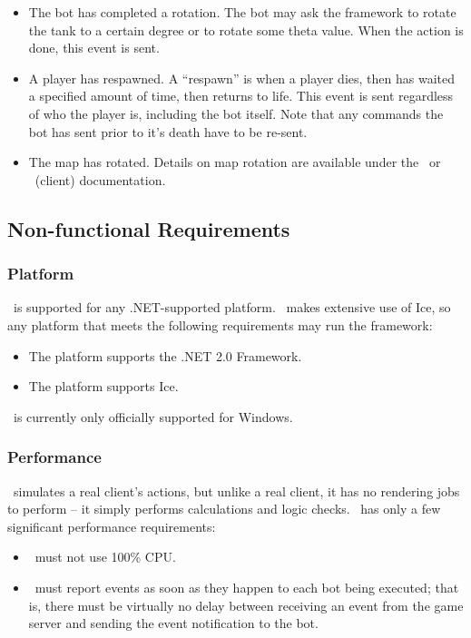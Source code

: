 \begin{itemize}
\item The bot has completed a rotation. The bot may ask the framework to rotate the tank to a certain degree or to rotate some theta value. When the action is done, this event is sent.
\item A player has respawned. A ``respawn'' is when a player dies, then has waited a specified amount of time, then returns to life. This event is sent regardless of who the player is, including the bot itself. Note that any commands the bot has sent prior to it's death have to be re-sent.
\item The map has rotated. Details on map rotation are available under the \GameServer\ or \Client\ (client) documentation.
\end{itemize}

\subsection{Non-functional Requirements}

\subsubsection*{Platform}

\AI\ is supported for any .NET-supported platform. \AI\ makes extensive use of Ice, so any platform that meets the following requirements may run the framework:
\begin{itemize}
\item The platform supports the .NET 2.0 Framework.
\item The platform supports Ice.
\end{itemize}

\AI\ is currently only officially supported for Windows.

\subsubsection*{Performance}

\AI\ simulates a real client's actions, but unlike a real client, it has no rendering jobs to perform -- it simply performs calculations and logic checks. \AI\ has only a few significant performance requirements:
\begin{itemize}
\item \AI\ must not use 100\% CPU.
\item \AI\ must report events as soon as they happen to each bot being executed; that is, there must be virtually no delay between receiving an event from the game server and sending the event notification to the bot.
\end{itemize}

